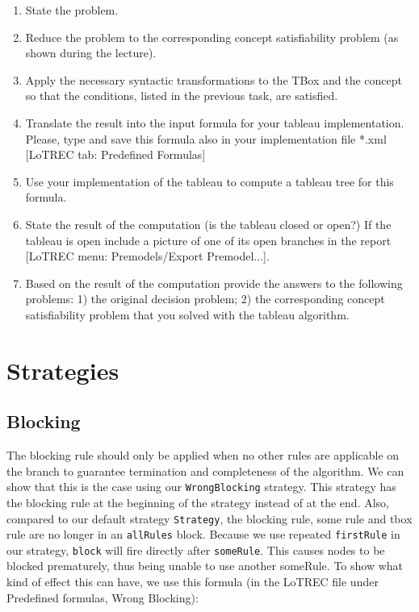 \documentclass[11pt]{article} %
\begin{document}
\begin{enumerate}
\item State the problem.
\item Reduce the problem to the corresponding concept satisfiability problem (as shown during the lecture).
\item Apply the necessary syntactic transformations to the TBox and the concept so that the conditions, listed in the previous task, are satisfied.
\item Translate the result into the input formula for your tableau implementation. Please, type and save this formula also in your implementation file *.xml [LoTREC tab: Predefined Formulas]
\item Use your implementation of the tableau to compute a tableau tree for this formula.
\item State the result of the computation (is the tableau closed or open?) If the tableau is open include a picture of one of its open branches in the report [LoTREC menu: Premodels/Export Premodel...].
\item Based on the result of the computation provide the answers to the following problems: 1) the original decision problem; 2) the corresponding concept satisfiability problem that you solved with the tableau algorithm.
\end{enumerate}

\section{Strategies}
\label{sec:strategies}

\subsection{Blocking}

The blocking rule should only be applied when no other rules are applicable on the branch to guarantee termination and completeness of the algorithm. We can show that this is the case using our \texttt{WrongBlocking} strategy. This strategy has the blocking rule at the beginning of the strategy instead of at the end. Also, compared to our default strategy \texttt{Strategy}, the blocking rule, some rule and tbox rule are no longer in an \texttt{allRules} block. Because we use repeated \texttt{firstRule} in our strategy, \texttt{block} will fire directly after \texttt{someRule}. This causes nodes to be blocked prematurely, thus being unable to use another someRule. To show what kind of effect this can have, we use this formula (in the LoTREC file under Predefined formulas, Wrong Blocking):
\end{document}
